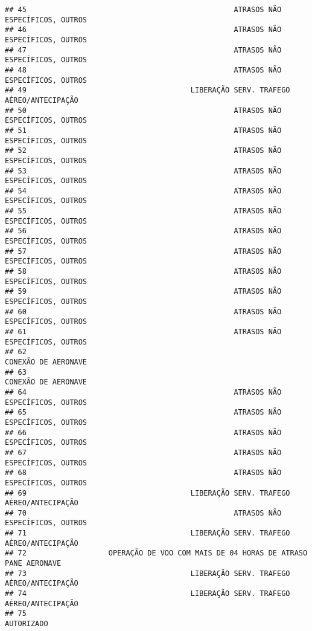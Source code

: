 \documentclass[
]{article}
\begin{document}
\begin{verbatim}
## 45                                                ATRASOS NÃO ESPECÍFICOS, OUTROS
## 46                                                ATRASOS NÃO ESPECÍFICOS, OUTROS
## 47                                                ATRASOS NÃO ESPECÍFICOS, OUTROS
## 48                                                ATRASOS NÃO ESPECÍFICOS, OUTROS
## 49                                      LIBERAÇÃO SERV. TRAFEGO AÉREO/ANTECIPAÇÃO
## 50                                                ATRASOS NÃO ESPECÍFICOS, OUTROS
## 51                                                ATRASOS NÃO ESPECÍFICOS, OUTROS
## 52                                                ATRASOS NÃO ESPECÍFICOS, OUTROS
## 53                                                ATRASOS NÃO ESPECÍFICOS, OUTROS
## 54                                                ATRASOS NÃO ESPECÍFICOS, OUTROS
## 55                                                ATRASOS NÃO ESPECÍFICOS, OUTROS
## 56                                                ATRASOS NÃO ESPECÍFICOS, OUTROS
## 57                                                ATRASOS NÃO ESPECÍFICOS, OUTROS
## 58                                                ATRASOS NÃO ESPECÍFICOS, OUTROS
## 59                                                ATRASOS NÃO ESPECÍFICOS, OUTROS
## 60                                                ATRASOS NÃO ESPECÍFICOS, OUTROS
## 61                                                ATRASOS NÃO ESPECÍFICOS, OUTROS
## 62                                                            CONEXÃO DE AERONAVE
## 63                                                            CONEXÃO DE AERONAVE
## 64                                                ATRASOS NÃO ESPECÍFICOS, OUTROS
## 65                                                ATRASOS NÃO ESPECÍFICOS, OUTROS
## 66                                                ATRASOS NÃO ESPECÍFICOS, OUTROS
## 67                                                ATRASOS NÃO ESPECÍFICOS, OUTROS
## 68                                                ATRASOS NÃO ESPECÍFICOS, OUTROS
## 69                                      LIBERAÇÃO SERV. TRAFEGO AÉREO/ANTECIPAÇÃO
## 70                                                ATRASOS NÃO ESPECÍFICOS, OUTROS
## 71                                      LIBERAÇÃO SERV. TRAFEGO AÉREO/ANTECIPAÇÃO
## 72                   OPERAÇÃO DE VOO COM MAIS DE 04 HORAS DE ATRASO PANE AERONAVE
## 73                                      LIBERAÇÃO SERV. TRAFEGO AÉREO/ANTECIPAÇÃO
## 74                                      LIBERAÇÃO SERV. TRAFEGO AÉREO/ANTECIPAÇÃO
## 75                                                                     AUTORIZADO

\end{verbatim}
\end{document}
